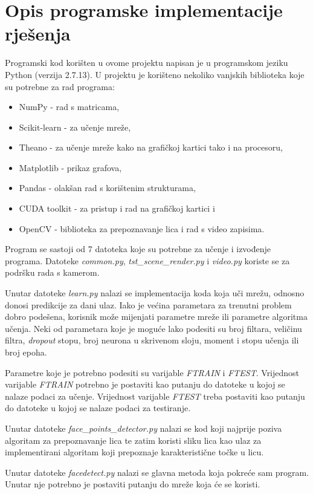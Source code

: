 \documentclass[times, utf8, zavrsni, numeric]{fer}
\begin{document}
\chapter{Opis programske implementacije rješenja}

Programski kod korišten u ovome projektu napisan je u programskom jeziku Python (verzija 2.7.13). U projektu je korišteno nekoliko vanjskih biblioteka koje su potrebne za rad programa:
\begin{itemize}
    \item NumPy - rad s matricama,
    \item Scikit-learn - za učenje mreže,
    \item Theano - za učenje mreže kako na grafičkoj kartici tako i na procesoru,
    \item Matplotlib - prikaz grafova,
    \item Pandas - olakšan rad s korištenim strukturama,
    \item CUDA toolkit - za pristup i rad na grafičkoj kartici i
    \item OpenCV - biblioteka za prepoznavanje lica i rad s video zapisima.
\end{itemize}

Program se sastoji od 7 datoteka koje su potrebne za učenje i izvođenje programa.
Datoteke \emph{common.py}, \emph{tst\_scene\_render.py} i \emph{video.py} koriste se za podršku rada s kamerom.

Unutar datoteke \emph{learn.py} nalazi se implementacija koda koja uči mrežu, odnosno donosi predikcije za dani ulaz. Iako je većina parametara za trenutni problem dobro podešena, korisnik može mijenjati parametre mreže ili parametre algoritma učenja. Neki od parametara koje je moguće lako podesiti su broj filtara, veličinu filtra, \textit{dropout} stopu, broj neurona u skrivenom sloju, moment i stopu učenja ili broj epoha.

Parametre koje je potrebno podesiti su varijable \emph{FTRAIN} i \emph{FTEST}. Vrijednost varijable \emph{FTRAIN} potrebno je postaviti kao putanju do datoteke u kojoj se nalaze podaci za učenje. Vrijednost varijable \emph{FTEST} treba postaviti kao putanju do datoteke u kojoj se nalaze podaci za testiranje.

Unutar datoteke \emph{face\_points\_detector.py} nalazi se kod koji najprije poziva algoritam za prepoznavanje lica te zatim koristi sliku lica kao ulaz za implementirani algoritam koji prepoznaje karakteristične točke u licu.

Unutar datoteke \emph{facedetect.py} nalazi se glavna metoda koja pokreće sam program. Unutar nje potrebno je postaviti putanju do mreže koja će se koristi.
\end{document}
